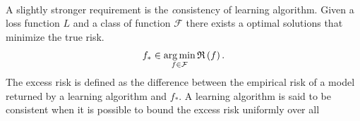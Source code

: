 \paragraph{}
A slightly stronger requirement is the {\emph consistency} of learning
algorithm.  Given a loss function $L$ and a class of function $\mathcal{F}$
there exists a optimal solutions that minimize the true risk.
\begin{dmath*}
    f_* \in \argmin_{f\in\mathcal{F}} \risk{f}.
\end{dmath*}
The excess risk is defined as the difference between the empirical risk of a
model returned by a learning algorithm and $f_*$. A learning algorithm is said
to be consistent when it is possible to bound the excess risk uniformly over
all
